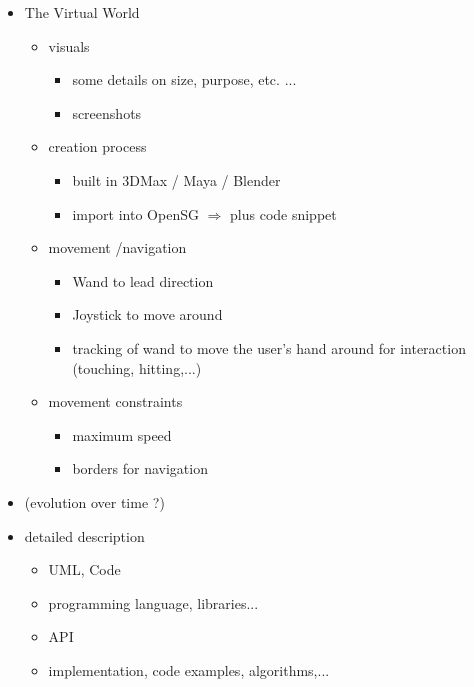 \documentclass[conference]{acmsiggraph}
\begin{document}
\begin{itemize}
{\begin{itemize}
{		
	}
	\end{itemize}
}
\item{The Virtual World
	\begin{itemize}
	\item visuals
		\begin{itemize}
		\item some details on size, purpose, etc. ...
		\item screenshots
		\end{itemize}
	\item creation process
		\begin{itemize}
		\item built in 3DMax / Maya / Blender
		\item import into OpenSG $\Rightarrow$ plus code snippet
		\end{itemize}
	\item movement /navigation
		\begin{itemize}
		\item Wand to lead direction
		\item Joystick to move around
		\item tracking of wand to move the user's hand around for interaction (touching, hitting,...)
		\end{itemize}
	\item movement constraints
		\begin{itemize}
		\item maximum speed
		\item borders for navigation
		\end{itemize}
	\end{itemize}
}
\item (evolution over time ?)
\item{
	detailed description
	\begin{itemize}
	\item UML, Code
	\item programming language, libraries...
	\item API
	\item implementation, code examples, algorithms,...
	\end{itemize}
}
\end{itemize}
\end{document}
